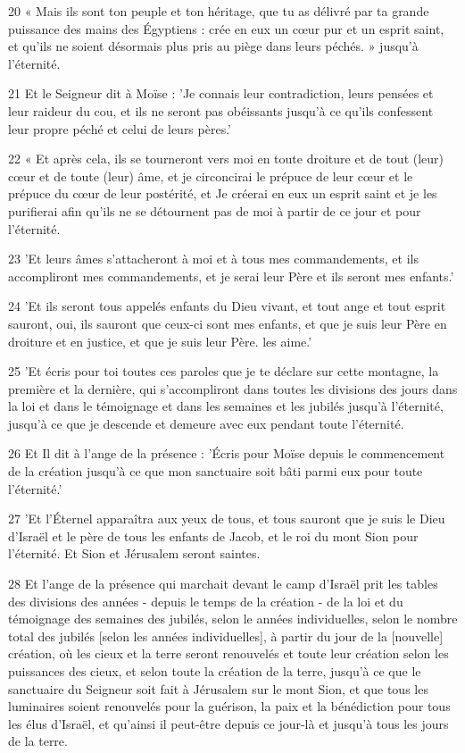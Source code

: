 \par 20 « Mais ils sont ton peuple et ton héritage, que tu as délivré par ta grande puissance des mains des Égyptiens : crée en eux un cœur pur et un esprit saint, et qu'ils ne soient désormais plus pris au piège dans leurs péchés. » jusqu'à l'éternité.
\par 21 Et le Seigneur dit à Moïse : 'Je connais leur contradiction, leurs pensées et leur raideur du cou, et ils ne seront pas obéissants jusqu'à ce qu'ils confessent leur propre péché et celui de leurs pères.'
\par 22 « Et après cela, ils se tourneront vers moi en toute droiture et de tout (leur) cœur et de toute (leur) âme, et je circoncirai le prépuce de leur cœur et le prépuce du cœur de leur postérité, et Je créerai en eux un esprit saint et je les purifierai afin qu'ils ne se détournent pas de moi à partir de ce jour et pour l'éternité.
\par 23 'Et leurs âmes s'attacheront à moi et à tous mes commandements, et ils accompliront mes commandements, et je serai leur Père et ils seront mes enfants.'
\par 24 'Et ils seront tous appelés enfants du Dieu vivant, et tout ange et tout esprit sauront, oui, ils sauront que ceux-ci sont mes enfants, et que je suis leur Père en droiture et en justice, et que je suis leur Père. les aime.'
\par 25 'Et écris pour toi toutes ces paroles que je te déclare sur cette montagne, la première et la dernière, qui s'accompliront dans toutes les divisions des jours dans la loi et dans le témoignage et dans les semaines et les jubilés jusqu'à l'éternité, jusqu'à ce que je descende et demeure avec eux pendant toute l'éternité.
\par 26 Et Il dit à l'ange de la présence : 'Écris pour Moïse depuis le commencement de la création jusqu'à ce que mon sanctuaire soit bâti parmi eux pour toute l'éternité.'
\par 27 'Et l'Éternel apparaîtra aux yeux de tous, et tous sauront que je suis le Dieu d'Israël et le père de tous les enfants de Jacob, et le roi du mont Sion pour l'éternité. Et Sion et Jérusalem seront saintes.
\par 28 Et l'ange de la présence qui marchait devant le camp d'Israël prit les tables des divisions des années - depuis le temps de la création - de la loi et du témoignage des semaines des jubilés, selon le années individuelles, selon le nombre total des jubilés [selon les années individuelles], à partir du jour de la [nouvelle] création, où les cieux et la terre seront renouvelés et toute leur création selon les puissances des cieux, et selon toute la création de la terre, jusqu'à ce que le sanctuaire du Seigneur soit fait à Jérusalem sur le mont Sion, et que tous les luminaires soient renouvelés pour la guérison, la paix et la bénédiction pour tous les élus d'Israël, et qu'ainsi il peut-être depuis ce jour-là et jusqu'à tous les jours de la terre.

